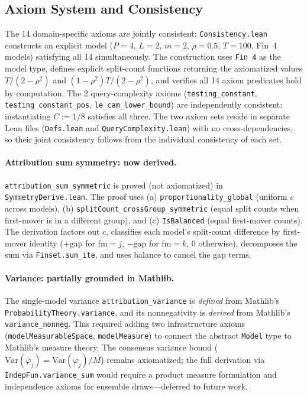 \documentclass{article}
\newcommand{\Var}{\mathrm{Var}}
\begin{document}
\subsection{Axiom System and Consistency}

The 14 domain-specific axioms are jointly consistent: \texttt{Consistency.lean} constructs an explicit model ($P{=}4$, $L{=}2$, $m{=}2$, $\rho{=}0.5$, $T{=}100$, Fin~4 models) satisfying all 14 simultaneously. The construction uses \texttt{Fin 4} as the model type, defines explicit split-count functions returning the axiomatized values $T/(2-\rho^2)$ and $(1-\rho^2)T/(2-\rho^2)$, and verifies all 14 axiom predicates hold by computation. The 2 query-complexity axioms (\texttt{testing\_constant}, \texttt{testing\_constant\_pos}, \texttt{le\_cam\_lower\_bound}) are independently consistent: instantiating $C := 1/8$ satisfies all three. The two axiom sets reside in separate Lean files (\texttt{Defs.lean} and \texttt{QueryComplexity.lean}) with no cross-dependencies, so their joint consistency follows from the individual consistency of each set.

\paragraph{Attribution sum symmetry: now derived.}
\texttt{attribution\_sum\_symmetric} is proved (not axiomatized) in \texttt{SymmetryDerive.lean}. The proof uses (a) \texttt{proportionality\_global} (uniform $c$ across models), (b) \texttt{splitCount\_crossGroup\_symmetric} (equal split counts when first-mover is in a different group), and (c) \texttt{IsBalanced} (equal first-mover counts). The derivation factors out $c$, classifies each model's split-count difference by first-mover identity ($+\text{gap}$ for fm$=j$, $-\text{gap}$ for fm$=k$, $0$ otherwise), decomposes the sum via \texttt{Finset.sum\_ite}, and uses balance to cancel the gap terms.

\paragraph{Variance: partially grounded in Mathlib.}
\begin{sloppypar}
The single-model variance \texttt{attribution\allowbreak\_variance} is \emph{defined}
from Mathlib's \texttt{ProbabilityTheory.variance}, and its nonnegativity is
\emph{derived} from Mathlib's \texttt{variance\allowbreak\_nonneg}. This required
adding two infrastructure axioms (\texttt{modelMeasurableSpace},
\texttt{modelMeasure}) to connect the abstract \texttt{Model} type to Mathlib's
measure theory. The consensus variance bound ($\Var(\bar\varphi_j) = \Var(\varphi_j)/M$)
remains axiomatized; the full derivation via \texttt{IndepFun.variance\_sum} would
require a product measure formulation and independence axioms for ensemble
draws---deferred to future work.
\end{sloppypar}
\end{document}
